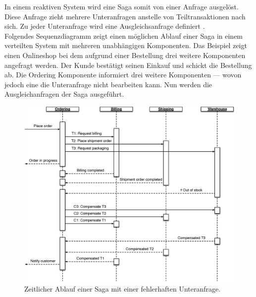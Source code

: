 In einem reaktiven System wird eine Saga somit von einer Anfrage ausgelöst. Diese Anfrage zieht mehrere Unteranfragen anstelle von Teiltransaktionen nach sich. Zu jeder Unteranfrage wird eine Ausgleichsanfrage definiert \cite{mccaffrey_goto_2015}.\\
Folgendes Sequenzdiagramm zeigt einen möglichen Ablauf einer Saga in einem verteilten System mit mehreren unabhängigen Komponenten. Das Beispiel zeigt einen Onlineshop bei dem aufgrund einer Bestellung drei weitere Komponenten angefragt werden. Der Kunde bestätigt seinen Einkauf und schickt die Bestellung ab. Die Ordering Komponente informiert drei weitere Komponenten --- wovon jedoch eine die Unteranfrage nicht bearbeiten kann. Nun werden die Ausgleichanfragen der Saga ausgeführt.

\begin{figure}[H]
 \centering
 \includegraphics[width=1\textwidth]{4-Hauptteil/saga/onlineshop-saga.eps}
 \caption{Zeitlicher Ablauf einer Saga mit einer fehlerhaften Unteranfrage.}
 \label{fig:sequence-saga}
\end{figure}

\pagebreak

